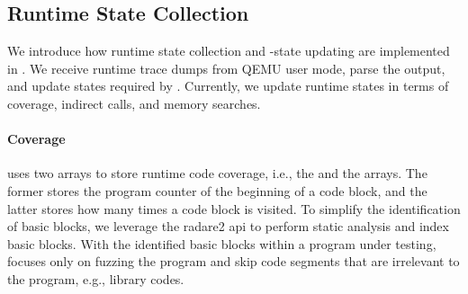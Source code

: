 %
%
%
%
%

\subsection{Runtime State Collection}
\label{lbl:runtime}

We introduce how runtime state collection and \libfuzzer \libfuzzer-state updating are implemented in \sys.
We receive runtime trace dumps from QEMU user mode, parse the output, and update states required by \libfuzzer.
Currently, we update runtime states in terms of coverage, indirect calls, and memory searches.

\paragraph{Coverage} \libfuzzer uses two arrays to store runtime code coverage, i.e., the  and the  arrays.
The former stores the program counter of the beginning of a code block, and the latter stores how many times a code block is visited.
%
%
To simplify the identification of basic blocks, we leverage the radare2 api  to perform static analysis and index basic blocks.
With the identified basic blocks within a program under testing, \sys focuses only on fuzzing the program and skip code segments that are irrelevant to the program, e.g., library codes.

